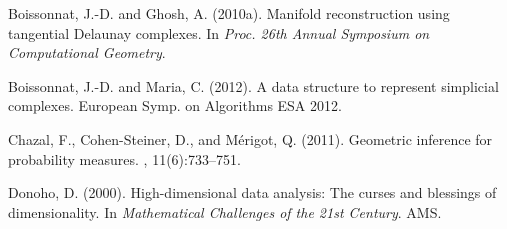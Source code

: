 % 
% 

\vspace{-3mm}

\begin{thebibliography}{}
\vspace{-2mm}

{\small %

Boissonnat, J.-D. and Ghosh, A. (2010a).
\newblock Manifold reconstruction using tangential {Delaunay} complexes.
\newblock In {\em Proc. 26th Annual Symposium on Computational Geometry}.

\vspace{-2mm}



Boissonnat, J.-D. and Maria, C. (2012).
\newblock A data structure to represent simplicial complexes.
\newblock European Symp. on Algorithms ESA 2012.

Chazal, F., Cohen-Steiner, D., and M\'erigot, Q. (2011).
\newblock Geometric inference for probability measures.
,
  11(6):733--751.
\vspace{-2mm}

Donoho, D. (2000).
\newblock High-dimensional data analysis: The curses and blessings of
  dimensionality.
\newblock In {\em Mathematical Challenges of the 21st Century}. AMS.
\vspace{-2mm}

}
\end{thebibliography}
